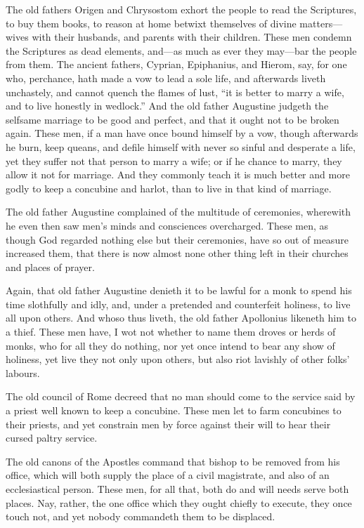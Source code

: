 The old fathers Origen and Chrysostom exhort the people to read the
Scriptures, to buy them books, to reason at home betwixt themselves
of divine matters—wives with their husbands, and parents with
their children. These men condemn the Scriptures as dead elements,
and—as much as
ever they may—bar the people from them. The ancient fathers,
Cyprian, Epiphanius, and Hierom, say, for one who, perchance, hath made
a vow to lead a sole life, and afterwards liveth unchastely, and cannot
quench the flames of lust, “it is better to marry a wife, and
to live honestly in wedlock.” And the old father Augustine
judgeth the selfsame marriage to be good and perfect, and that it ought
not to be broken again. These men, if a man have once bound himself
by a vow, though afterwards he burn, keep queans, and defile himself
with never so sinful and desperate a life, yet they suffer not that
person to marry a wife; or if he chance to marry, they allow it not
for marriage. And they commonly teach it is much better and more
godly to keep a concubine and harlot, than to live in that kind of marriage.

The old father Augustine complained of the multitude of ceremonies,
wherewith he even then saw men’s minds and consciences overcharged.
These men, as though God regarded nothing else but their ceremonies,
have so out of measure increased them, that there is now almost none
other thing left in their churches and places of prayer.

Again, that old father Augustine denieth it to
be lawful for a monk to spend his time slothfully and idly, and, under
a pretended and counterfeit holiness, to live all upon others.
And whoso thus liveth, the old father Apollonius likeneth him to a thief.
These men have, I wot not whether to name them droves or herds of monks,
who for all they do nothing, nor yet once intend to bear any show of
holiness, yet live they not only upon others, but also riot lavishly
of other folks’ labours.

The old council of Rome decreed that no man should come to the service
said by a priest well known to keep a concubine. These men let
to farm concubines to their priests, and yet constrain men by force
against their will to hear their cursed paltry service.

The old canons of the Apostles command that bishop to be removed
from his office, which will both supply the place of a civil magistrate,
and also of an ecclesiastical person. These men, for all that,
both do and will needs serve both places. Nay, rather, the one
office which they ought chiefly to execute, they once touch not, and
yet nobody commandeth them to be displaced.

